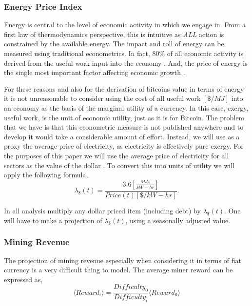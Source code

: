 \documentclass[runningheads]{llncs}
\begin{document}
\subsubsection{Energy Price Index}
Energy is central to the level of economic activity in which we engage in.
From a first law of thermodynamics perspective, this is intuitive as \emph{ALL} action is constrained by the available energy.
The impact and roll of energy can be measured using traditional econometrics.
In fact, 80\% of all economic activity is derived from the useful work input into the economy \cite{ayers2009engine}.
And, the price of energy is the single most important factor affecting economic growth \cite{ayers2009engine}.

For these reasons and also for the derivation of bitcoins value in terms of energy it is not unreasonable to consider using the cost of all useful work $[\$/MJ]$ into an economy as the basis of the marginal utility of a currency.
In this case, exergy, useful work, is the unit of economic utility, just as it is for Bitcoin.
The problem that we have is that this econometric measure is not published anywhere and to develop it would take a considerable amount of effort.
Instead, we will use as a proxy the average price of electricity, as electricity is effectively pure exergy.
For the purposes of this paper we will use the average price of electricity for all sectors as the value of the dollar \cite{eia2021browser}.
To convert this into units of utility we will apply the following formula,
\begin{equation}
    \lambda_{\$}(t) = \frac{3.6[\frac{MJ_U}{kW-hr}]}{Price(t)[\$/kW-hr]}.\label{eq:10}
\end{equation}

In all analysis multiply any dollar priced item (including debt) by $\lambda_{\$}(t)$.
One will have to make a projection of $\lambda_{\$}(t)$, using a seasonally adjusted value.

\subsubsection{Mining Revenue}
The projection of mining revenue especially when considering it in terms of fiat currency is a very difficult thing to model.
The average miner reward can be expressed as,
\begin{equation}
    \langle Reward_i \rangle = \frac{Difficulty_0}{Difficulty_i}\langle Reward_0 \rangle
\end{equation}
\end{document}
